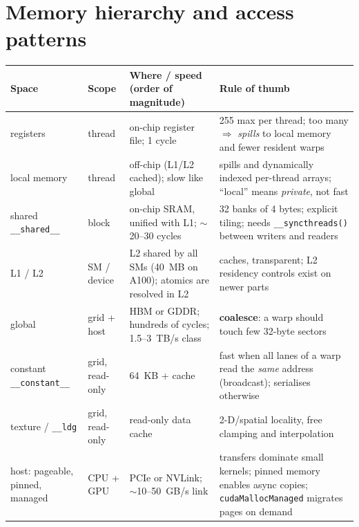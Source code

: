 \documentclass[10pt,a4paper,openany,oneside]{report}
\newcommand{\prio}[1]{\texorpdfstring{\ifcase#1\or{\color{gold}\ding{72}}\or{\color{gold}\ding{72}\ding{72}}\or{\color{gold}\ding{72}\ding{72}\ding{72}}\fi}{}}
\begin{document}
\section{Memory hierarchy and access patterns \prio{3}}
\label{sec:mem}
\begin{center}\small
\begin{xltabular}{\textwidth}{@{}L{2.1cm}L{1.9cm}L{4.6cm}Y@{}}
\toprule
\textbf{Space} & \textbf{Scope} & \textbf{Where / speed (order of magnitude)} & \textbf{Rule of thumb}\\
\midrule\endhead
registers & thread & on-chip register file; 1 cycle & 255 max per thread; too many $\Rightarrow$ \emph{spills} to local memory and fewer resident warps\\
local memory & thread & off-chip (L1/L2 cached); slow like global & spills and dynamically indexed per-thread arrays; ``local'' means \emph{private}, not fast\\
shared \texttt{\_\_shared\_\_} & block & on-chip SRAM, unified with L1; $\sim$20--30 cycles & 32 banks of 4 bytes; explicit tiling; needs \texttt{\_\_syncthreads()} between writers and readers\\
L1 / L2 & SM / device & L2 shared by all SMs (40~MB on A100); atomics are resolved in L2 & caches, transparent; L2 residency controls exist on newer parts\\
global & grid + host & HBM or GDDR; hundreds of cycles; 1.5--3~TB/s class & \textbf{coalesce}: a warp should touch few 32-byte sectors\\
constant \texttt{\_\_constant\_\_} & grid, read-only & 64~KB + cache & fast when all lanes of a warp read the \emph{same} address (broadcast); serialises otherwise\\
texture / \texttt{\_\_ldg} & grid, read-only & read-only data cache & 2-D/spatial locality, free clamping and interpolation\\
host: pageable, pinned, managed & CPU + GPU & PCIe or NVLink; $\sim$10--50~GB/s link & transfers dominate small kernels; pinned memory enables async copies; \texttt{cudaMallocManaged} migrates pages on demand\\
\bottomrule
\end{xltabular}
\end{center}
\end{document}
